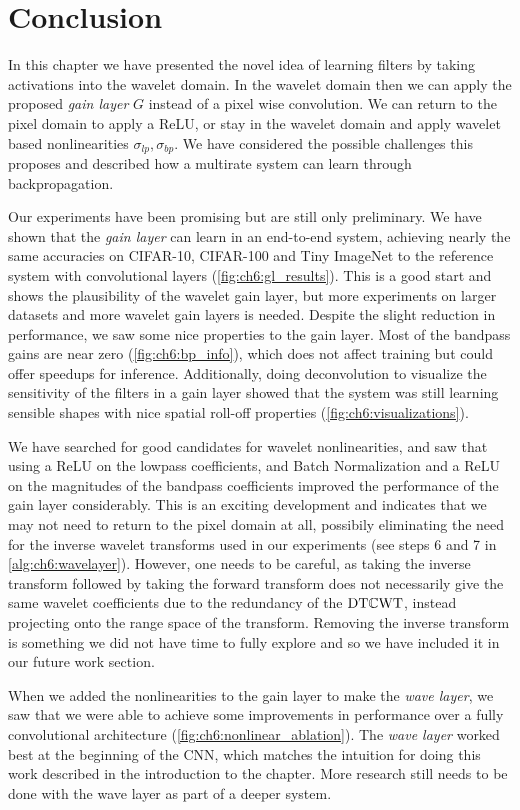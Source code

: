 \section{Conclusion}
In this chapter we have presented the novel idea of learning filters by taking
activations into the wavelet domain. In the wavelet domain then we can apply
the proposed \emph{gain layer} $G$ instead of a pixel wise convolution. We can
return to the pixel domain to apply a ReLU, or stay in the wavelet domain
and apply wavelet based nonlinearities $\sigma_{lp}, \sigma_{bp}$. We have considered the possible
challenges this proposes and described how a multirate system can learn through
backpropagation. 

Our experiments have been promising but are still only preliminary. We have
shown that the \emph{gain layer} can learn in an end-to-end system, achieving nearly
the same accuracies on CIFAR-10, CIFAR-100 and Tiny ImageNet to the reference system with
convolutional layers (\autoref{fig:ch6:gl_results}). This is a good start and shows the plausibility of
the wavelet gain layer, but more experiments on larger datasets and more wavelet
gain layers is needed. Despite the slight reduction in performance, we saw some
nice properties to the gain layer. Most of the bandpass gains are near zero
(\autoref{fig:ch6:bp_info}),
which does not affect training but could offer speedups for inference.
Additionally, doing deconvolution to visualize the sensitivity of the filters in
a gain layer showed that the system was still learning sensible shapes with nice
spatial roll-off properties (\autoref{fig:ch6:visualizations}).

We have searched for good candidates for wavelet nonlinearities, and saw that
using a ReLU on the lowpass coefficients, and
Batch Normalization and a ReLU on the magnitudes of the bandpass coefficients
improved the performance of the gain layer considerably. This is an exciting
development and indicates that we may not need to return to the pixel domain at
all, possibily eliminating the need for the inverse wavelet
transforms used in our experiments (see steps 6 and 7 in
\autoref{alg:ch6:wavelayer}). However, one needs to be careful, as taking the inverse transform 
followed by taking the forward transform does not necessarily give the same
wavelet coefficients due to the redundancy of the $\mathrm{DT}\mathbb{C}\mathrm{WT}$, instead projecting
onto the range space of the transform. Removing the inverse transform is
something we did not have time to fully explore and so we have included it in
our future work section. 

When we added the nonlinearities to the gain layer to
make the \emph{wave layer}, we saw that we were able to achieve some
improvements in performance over a fully convolutional architecture
(\autoref{fig:ch6:nonlinear_ablation}). The \emph{wave layer}
worked best at the beginning of the CNN, which matches the intuition for doing
this work described in the introduction to the chapter. More research still
needs to be done with the wave layer as part of a deeper system. 
